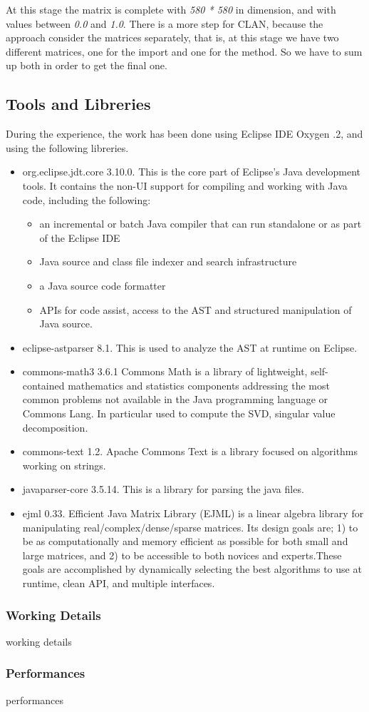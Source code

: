 At this stage the matrix is complete with \emph{580 * 580} in dimension, and with values between \emph{0.0} and \emph{1.0}.
There is a more step for CLAN, because the approach consider the matrices separately, that is, at this stage we have two different matrices, one for the import and one for the method. So we have to sum up both in order to get the final one.

\subsection{Tools and Libreries}
During the experience, the work has been done using Eclipse IDE Oxygen .2, and using the following libreries.
\begin{itemize}
\item org.eclipse.jdt.core 3.10.0. 
This is the core part of Eclipse's Java development tools. It contains the non-UI support for compiling and working with Java code, including the following:
	\begin{itemize}
	\item an incremental or batch Java compiler that can run standalone or as part of the Eclipse IDE
	\item Java source and class file indexer and search infrastructure
	\item a Java source code formatter
	\item APIs for code assist, access to the AST and structured manipulation of Java source.
	\end{itemize}
\item eclipse-astparser 8.1. This is used to analyze the AST at runtime on Eclipse.
\item commons-math3 3.6.1 Commons Math is a library of lightweight, self-contained mathematics and statistics components addressing the most common problems not available in the Java programming language or Commons Lang. 
In particular used to compute the SVD, singular value decomposition.
\item commons-text 1.2. Apache Commons Text is a library focused on algorithms working on strings. 
\item javaparser-core 3.5.14. This is a library for parsing the java files.
\item ejml 0.33. Efficient Java Matrix Library (EJML) is a linear algebra library for manipulating real/complex/dense/sparse matrices. Its design goals are; 1) to be as computationally and memory efficient as possible for both small and large matrices, and 2) to be accessible to both novices and experts.These goals are accomplished by dynamically selecting the best algorithms to use at runtime, clean API, and multiple interfaces.
\end{itemize}


\subsubsection{Working Details}

working details

\subsubsection{Performances}

performances

